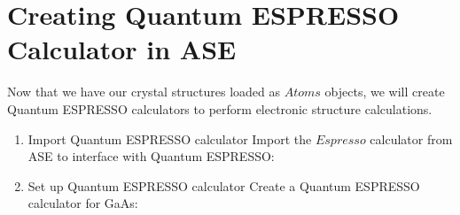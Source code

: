 \documentclass[letterpaper,10pt,english]{sphinxmanual}
\begin{document}
\section{Creating Quantum ESPRESSO Calculator in ASE}
\label{\detokenize{qease/qease:creating-quantum-espresso-calculator-in-ase}}
\sphinxAtStartPar
Now that we have our crystal structures loaded as \(Atoms\) objects, we will create Quantum ESPRESSO calculators to perform electronic structure calculations.
\begin{enumerate}
%
\item {} 
\sphinxAtStartPar
Import Quantum ESPRESSO calculator
\sphinxhyphen{} Import the \(Espresso\) calculator from ASE to interface with Quantum ESPRESSO:
\begin{quote}

\begin{sphinxVerbatim}[commandchars=\\\{\}]
   
\end{sphinxVerbatim}
\end{quote}

\item {} 
\sphinxAtStartPar
Set up Quantum ESPRESSO calculator
\sphinxhyphen{} Create a Quantum ESPRESSO calculator for GaAs:
\begin{quote}


\end{quote}
\end{enumerate}
\end{document}
